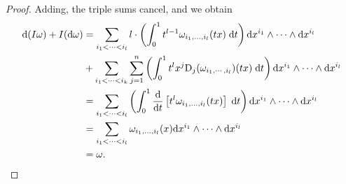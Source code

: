 \begin{proof}
Adding, the triple sums cancel, and we obtain 
\begin{align*}
    \mathrm{d}(I\omega) + I(\mathrm{d}\omega)
    & = \sum_{i_1<\cdots<i_l}l\cdot\left(\int_0^1t^{l-1}\omega_{i_1,\ldots,i_l}(tx)\;\mathrm{d} t\right)\mathrm{d} x^{i_1}\wedge\cdots\wedge\mathrm{d} x^{i_l} \\
    & \hspace*{0em} + \sum_{i_1<\cdots<i_k}^{}\sum_{j=1}^{n}\left(\int_0^1t^l x^j\mathrm{D}_j(\omega_{i_1,\cdots,i_l})(tx)\;\mathrm{d} t\right) \mathrm{d} x^{i_1}\wedge\cdots\wedge\mathrm{d} x^{i_l} \\
    & = \sum_{i_1<\cdots<i_l}\left(\int_0^1\frac{\mathrm{d} }{\mathrm{d} t}\left[t^{l}\omega_{i_1,\ldots,i_l}(tx)\right]\;\mathrm{d} t\right)\mathrm{d} x^{i_1}\wedge\cdots\wedge\mathrm{d} x^{i_l} \\
    & = \sum_{i_1<\cdots<i_l}\omega_{i_1,\ldots,i_l}(x)\mathrm{d} x^{i_1}\wedge\cdots\wedge\mathrm{d} x^{i_l} \\
    & = \omega.
\end{align*}
\end{proof}

